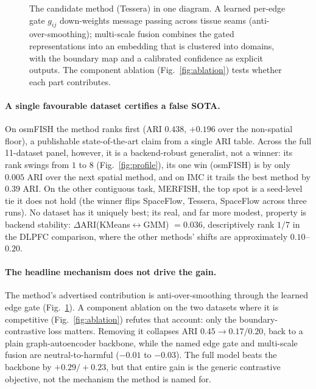 \documentclass[journal]{IEEEtran}
\begin{document}
\begin{figure}[!t]\centering

\caption{The candidate method (Tessera) in one diagram. A learned per-edge gate $g_{ij}$ down-weights
message passing across tissue seams (anti-over-smoothing); multi-scale fusion combines the gated
representations into an embedding that is clustered into domains, with the boundary map and a calibrated
confidence as explicit outputs. The component ablation (Fig.~\ref{fig:ablation}) tests whether each
part contributes.}
\label{fig:arch}
\end{figure}

\paragraph{A single favourable dataset certifies a false SOTA.} On osmFISH the method ranks first (ARI $0.438$,
$+0.196$ over the non-spatial floor), a publishable state-of-the-art claim from a single ARI table.
Across the full 11-dataset panel, however, it is a backend-robust generalist, not a winner: its rank
swings from $1$ to $8$ (Fig.~\ref{fig:profile}), its one win (osmFISH) is by only $0.005$ ARI over the next
spatial method, and on IMC it trails the best method by $0.39$ ARI. On the other contiguous task, MERFISH,
the top spot is a seed-level tie it does not hold (the winner flips SpaceFlow, Tessera, SpaceFlow across
three runs). No dataset has it uniquely best; its real, and far more modest, property is backend stability:
$\Delta$ARI(KMeans$\leftrightarrow$GMM) $=0.036$, descriptively rank $1/7$ in the DLPFC comparison,
where the other methods' shifts are approximately $0.10$--$0.20$.

\paragraph{The headline mechanism does not drive the gain.} The method's advertised contribution is
anti-over-smoothing through the learned edge gate (Fig.~\ref{fig:arch}). A component ablation on the two
datasets where it is competitive (Fig.~\ref{fig:ablation}) refutes that account: only the
boundary-contrastive loss matters. Removing it collapses ARI $0.45\!\to\!0.17/0.20$, back to a
plain graph-autoencoder backbone, while the named edge gate and multi-scale fusion are neutral-to-harmful
($-0.01$ to $-0.03$). The full model beats the backbone by $+0.29/+0.23$, but that entire gain is the
generic contrastive objective, not the mechanism the method is named for.
\end{document}
